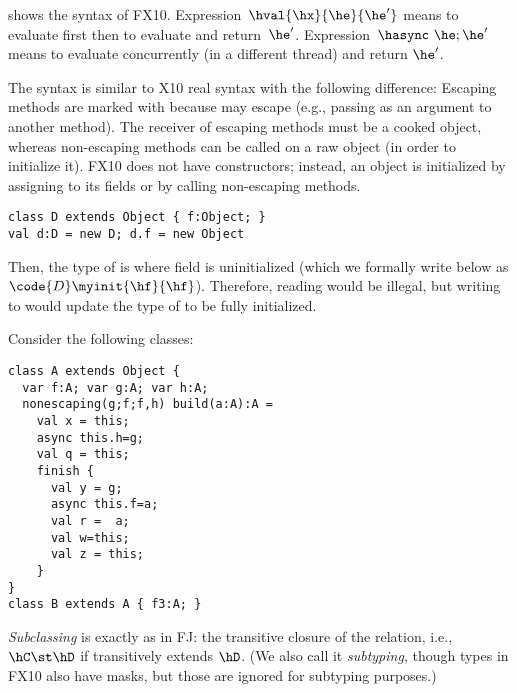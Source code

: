  shows the syntax of FX10.
Expression~$\hval{\hx}{\he}{\he'}$ means to evaluate first \he then to evaluate and return~$\he'$.
Expression~$\hasync~\he;\he'$ means to evaluate \he concurrently (in a different thread) and return $\he'$.

The syntax is similar to X10 real syntax with the following difference:
Escaping methods are marked with \hescaping
    because \this may escape (e.g., passing \this as an argument to another method).
The receiver of escaping methods must be a cooked object,
    whereas non-escaping methods can be called on a raw object (in order to initialize it).
FX10 does not have constructors; instead, an object is initialized by assigning to its fields or
    by calling
    non-escaping methods.

\begin{lstlisting}
class D extends Object { f:Object; }
val d:D = new D; d.f = new Object
\end{lstlisting}
Then, the type of  is  where field  is uninitialized
    (which we formally write below as $\code{D}\myinit{\hf}{\hf}$).
Therefore, reading  would be illegal, but writing to  would update the type of 
    to be fully initialized.


Consider the following classes:
\begin{lstlisting}
class A extends Object {
  var f:A; var g:A; var h:A;
  nonescaping(g;f;f,h) build(a:A):A =
    val x = this;
    async this.h=g;
    val q = this;
    finish {
      val y = g;
      async this.f=a;
      val r =  a;
      val w=this; 
      val z = this;
    }
}
class B extends A { f3:A; }
\end{lstlisting}


\emph{Subclassing} is exactly as in FJ:
    the transitive closure of the \hextends relation,
    i.e., $\hC \st \hD$ if \hC transitively extends $\hD$.
(We also call it \emph{subtyping}, though types in FX10 also have masks,
    but those are ignored for subtyping purposes.)

